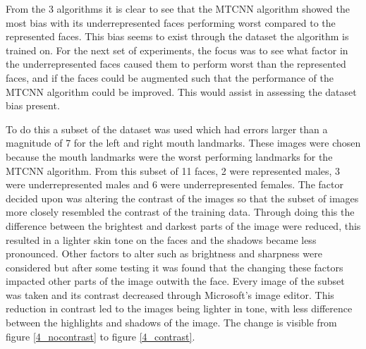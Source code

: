 \documentclass{l4proj}
\begin{document}
From the 3 algorithms it is clear to see that the MTCNN algorithm showed the most bias with its underrepresented faces performing worst compared to the represented faces. This bias seems to exist through the dataset the algorithm is trained on. For the next set of experiments, the focus was to see what factor in the underrepresented faces caused them to perform worst than the represented faces, and if the faces could be augmented such that the performance of the MTCNN algorithm could be improved. This would assist in assessing the dataset bias present.

To do this a subset of the dataset was used which had errors larger than a magnitude of 7 for the left and right mouth landmarks. These images were chosen because the mouth landmarks were the worst performing landmarks for the MTCNN algorithm. From this subset of 11 faces, 2 were represented males, 3 were underrepresented males and 6 were underrepresented females. The factor decided upon was altering the contrast of the images so that the subset of images more closely resembled the contrast of the training data. Through doing this the difference between the brightest and darkest parts of the image were reduced, this resulted in a lighter skin tone on the faces and the shadows became less pronounced. Other factors to alter such as brightness and sharpness were considered but after some testing it was found that the changing these factors impacted other parts of the image outwith the face. Every image of the subset was taken and its contrast decreased through Microsoft's image editor. This reduction in contrast led to the images being lighter in tone, with less difference between the highlights and shadows of the image. The change is visible from figure \ref{4_nocontrast} to figure \ref{4_contrast}.
\end{document}
